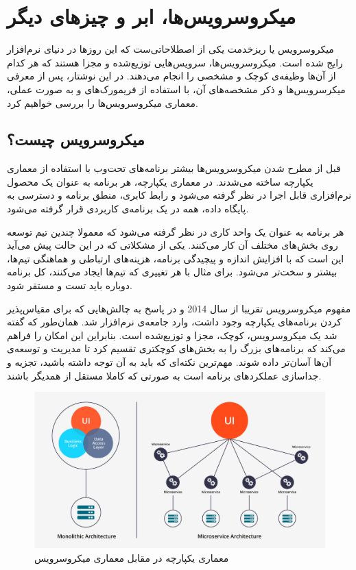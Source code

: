 \documentclass[a4paper,12pt]{book}
\begin{document}
\chapter{میکروسرویس‌ها، ابر و چیزهای دیگر}

میکروسرویس‌‌  یا ریزخدمت
یکی از اصطلاحاتی‌ست که این روزها در دنیای نرم‌افزار رایج شده است. میکروسرویس‌‌ها، سرویس‌هایی توزیع‌شده و مجزا هستند که هر کدام از آن‌ها وظیفه‌ی کوچک و مشخصی را انجام می‌دهند. در این نوشتار، پس از معرفی میکرسرویس‌ها و ذکر  مشخصه‌های آن،‌ با استفاده از فریمورک‌های 
و
به صورت عملی، معماری میکروسرویس‌ها را بررسی خواهیم کرد.

\section{میکروسرویس چیست؟}
قبل از مطرح شدن میکروسرویس‌ها بیشتر برنامه‌های تحت‌وب با استفاده از معماری یکپارچه
ساخته می‌شدند. در معماری یکپارچه، هر برنامه به عنوان یک محصول نرم‌افزاری قابل اجرا در نظر گرفته می‌شود و رابط کابری، منطق برنامه و دسترسی به پایگاه داده، همه در یک برنامه‌ی کاربردی قرار گرفته می‌شود. 

هر برنامه به عنوان یک واحد کاری در نظر گرفته می‌شود که معمولا چندین تیم توسعه روی بخش‌های مختلف آن کار می‌کنند. یکی از مشکلاتی که در این حالت پیش می‌آید این است که با افزایش اندازه و پیچیدگی برنامه،‌ هزینه‌های ارتباطی و هماهنگی تیم‌ها، بیشتر و سخت‌تر می‌شود. برای مثال با هر تغییری که تیم‌ها ایجاد می‌کنند، کل برنامه دوباره باید تست و مستقر شود. 

مفهوم میکروسرویس تقریبا از سال 2014 و در پاسخ به چالش‌هایی که برای مقیاس‌پذیر کردن برنامه‌های یکپارچه وجود داشت، وارد جامعه‌ی نرم‌افزار شد. همان‌طور که گفته شد یک میکروسرویس، کوچک، مجزا و توزیع‌شده است. بنابراین این امکان را فراهم می‌کند که برنامه‌های بزرگ را به بخش‌های کوچکتری تقسیم کرد تا مدیریت و توسعه‌ی آن‌ها آسان‌تر داده شوند. مهم‌ترین نکته‌ای که باید به آن توجه داشته باشید، تجزیه و جداسازی عملکردهای برنامه است به صورتی که کاملا مستقل از همدیگر باشند. 

\begin{figure}[h]
	\centering
	\includegraphics[width=\textwidth]{1.png}
	\caption{ معماری یکپارچه در مقابل معماری میکروسرویس}
	\label{fig:1}
\end{figure}
\end{document}
